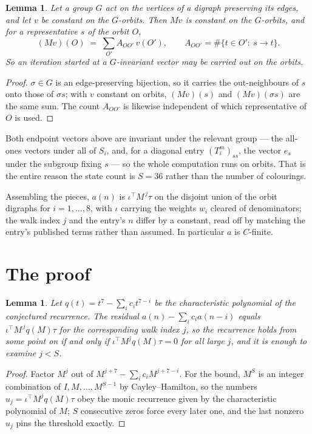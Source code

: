 \documentclass[11pt,a4paper]{article}
\theoremstyle{plain}
\newtheorem{lemma}[theorem]{Lemma}
\theoremstyle{definition}
\begin{document}
\begin{lemma}\label{lem:lump}
Let a group $G$ act on the vertices of a digraph preserving its edges, and let $v$ be constant
on the $G$-orbits. Then $Mv$ is constant on the $G$-orbits, and for a representative $s$ of
the orbit $O$,
\[
(Mv)(O)\;=\;\sum_{O'}A_{OO'}\,v(O'),\qquad
A_{OO'}=\#\{t\in O':\ s\to t\} .
\]
So an iteration started at a $G$-invariant vector may be carried out on the orbits.
\end{lemma}

\begin{proof}
$\sigma\in G$ is an edge-preserving bijection, so it carries the out-neighbours of $s$ onto
those of $\sigma s$; with $v$ constant on orbits, $(Mv)(s)$ and $(Mv)(\sigma s)$ are the same
sum. The count $A_{OO'}$ is likewise independent of which representative of $O$ is used.
\end{proof}

Both endpoint vectors above are invariant under the relevant group --- the all-ones vectors
under all of $S_i$, and, for a diagonal entry $(T_i^m)_{ss}$, the vector $e_s$ under the
subgroup fixing $s$ --- so the whole computation runs on orbits. That is the entire reason the
state count is $S=36$ rather than the number of colourings.

Assembling the pieces, $a(n)$ is $\iota^{\!\top}M^{\,j}\tau$ on the disjoint union of the
orbit digraphs for $i=1,\dots,8$, with $\iota$ carrying the weights $w_i$ cleared of
denominators; the walk index $j$ and the entry's $n$ differ by a constant, read off by
matching the entry's published terms rather than assumed. In particular $a$ is $C$-finite.

\section{The proof}

\begin{lemma}\label{lem:crit}
Let $q(t)=t^{7}-\sum_i c_it^{7-i}$ be the characteristic polynomial of the
conjectured recurrence. The residual $a(n)-\sum_ic_ia(n-i)$ equals
$\iota^{\!\top}M^{\,j}q(M)\tau$ for the corresponding walk index $j$, so the recurrence
holds from some point on if and only if $\iota^{\!\top}M^{j}q(M)\tau=0$ for all large $j$,
and it is enough to examine $j<S$.
\end{lemma}

\begin{proof}
Factor $M^{j}$ out of $M^{j+7}-\sum_ic_iM^{j+7-i}$. For the bound, $M^{S}$
is an integer combination of $I,M,\dots,M^{S-1}$ by Cayley--Hamilton, so the numbers
$u_j=\iota^{\!\top}M^{j}q(M)\tau$ obey the monic recurrence given by the characteristic
polynomial of $M$; $S$ consecutive zeros force every later one, and the last nonzero $u_j$
pins the threshold exactly.
\end{proof}
\end{document}
